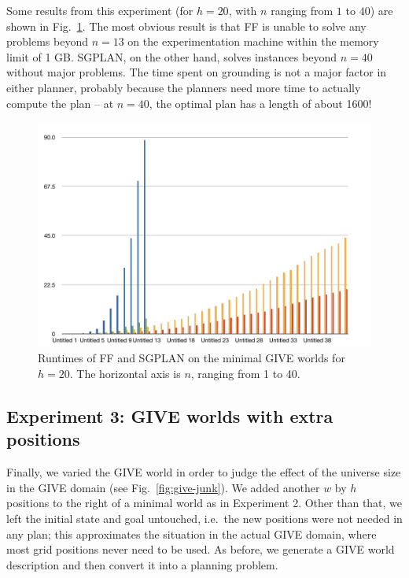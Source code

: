 Some results from this experiment (for $h=20$, with $n$ ranging from
$1$ to $40$) are shown in Fig.~\ref{fig:give-runtime-minimal}.  The
most obvious result is that FF is unable to solve any problems beyond
$n=13$ on the experimentation machine within the memory limit of 1 GB.
SGPLAN, on the other hand, solves instances beyond $n=40$ without
major problems.  The time spent on grounding is not a major factor in
either planner, probably because the planners need more time to
actually compute the plan -- at $n=40$, the optimal plan has a length
of about 1600!

\begin{figure}
  \centering
  \includegraphics[width=1\columnwidth]{pic-runtime-buttons}
  \caption{Runtimes of FF and SGPLAN on the minimal GIVE worlds for $h=20$. The horizontal axis is $n$, ranging from 1 to 40.}
  \label{fig:give-runtime-minimal}
\end{figure}

\subsection{Experiment 3: GIVE worlds with extra positions}
\label{sec:experiment-3:-give}

Finally, we varied the GIVE world in order to judge the effect of the
universe size in the GIVE domain (see Fig.~\ref{fig:give-junk}).  We
added another $w$ by $h$ positions to the right of a minimal world as
in Experiment 2.  Other than that, we left the initial state and goal
untouched, i.e.\ the new positions were not needed in any plan; this
approximates the situation in the actual GIVE domain, where most grid
positions never need to be used.  As before, we generate a GIVE world
description and then convert it into a planning problem.

